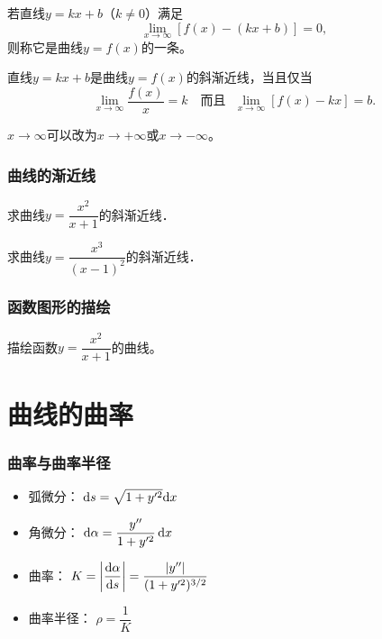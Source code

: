 \documentclass[14pt,notheorems,leqno,xcolor={rgb}]{beamer} %
\begin{document}
\begin{frame}
\begin{definition}
若直线$y=kx+b$（$k\neq0$）满足
$$\lim\limits_{x\to\infty}[f(x)-(kx+b)]=0,$$
则称它是曲线$y=f(x)$的一条。
\end{definition}
\vpause
\begin{theorem}
直线$y=kx+b$是曲线$y=f(x)$的斜渐近线，当且仅当
$$\lim_{x\to\infty}\frac{f(x)}{x}=k\text{~~~而且~~}\lim_{x\to\infty}[f(x)-kx]=b.$$
\end{theorem}
\vpause
\begin{remark*}
$x\to\infty$可以改为$x\to+\infty$或$x\to-\infty$。
\end{remark*}
\end{frame}

\begin{frame}
\frametitle{曲线的渐近线}
\begin{example}
求曲线$y=\dfrac{x^2}{x+1}$的斜渐近线．
\end{example}\pause
\begin{exercise}
求曲线$y=\dfrac{x^3}{(x-1)^2}$的斜渐近线．
\end{exercise}
\end{frame}

\begin{frame}
\frametitle{函数图形的描绘}
\begin{example}
描绘函数$y=\dfrac{x^2}{x+1}$的曲线。
\end{example}
\end{frame}

\section{曲线的曲率}

\begin{frame}
\frametitle{曲率与曲率半径}
\begin{itemize}
  \item 弧微分： $\mathop{}\!\mathrm{d} s=\sqrt{1+y'^2}{\mathop{}\!\mathrm{d} x}$
  \item 角微分： $\mathop{}\!\mathrm{d}\alpha=\dfrac{y''}{1+y'^2}\mathop{}\!\mathrm{d} x$
  \item 曲率： $K=\left|\dfrac{\mathop{}\!\mathrm{d}\alpha}{\mathop{}\!\mathrm{d} s}\right|=\dfrac{|y''|}{(1+y'^2)^{3/2}}$
  \item 曲率半径： $\rho=\dfrac1K$
\end{itemize}
\end{frame}
\end{document}
